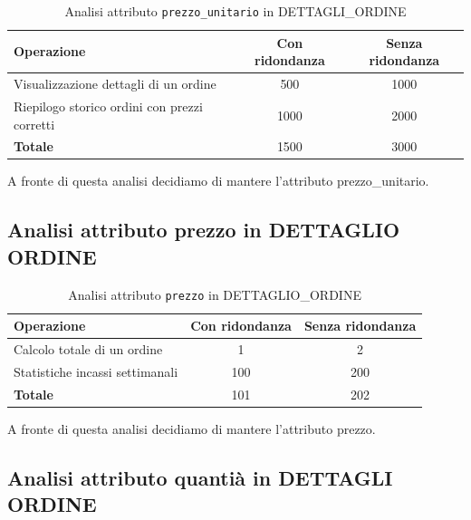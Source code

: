 \documentclass[a4paper,12pt]{report}
\begin{document}
\begin{table}[H]
	\centering
	\begin{tabular}{|l|c|c|}
		\hline
		\textbf{Operazione}                          & \textbf{Con ridondanza} & \textbf{Senza ridondanza} \\
		\hline
		Visualizzazione dettagli di un ordine        & 500                     & 1000                      \\
		Riepilogo storico ordini con prezzi corretti & 1000                    & 2000                      \\
		\hline
		\textbf{Totale}                              & 1500                    & 3000                      \\
		\hline
	\end{tabular}
	\caption{Analisi attributo \texttt{prezzo\_unitario} in DETTAGLI\_ORDINE}
\end{table}

A fronte di questa analisi decidiamo di mantere l'attributo prezzo\_unitario.

\subsection{Analisi attributo prezzo in DETTAGLIO ORDINE}

\begin{table}[H]
	\centering
	\begin{tabular}{|l|c|c|}
		\hline
		\textbf{Operazione}             & \textbf{Con ridondanza} & \textbf{Senza ridondanza} \\
		\hline
		Calcolo totale di un ordine     & 1                       & 2                         \\
		Statistiche incassi settimanali & 100                     & 200                       \\
		\hline
		\textbf{Totale}                 & 101                     & 202                       \\
		\hline
	\end{tabular}
	\caption{Analisi attributo \texttt{prezzo} in DETTAGLIO\_ORDINE}
\end{table}

A fronte di questa analisi decidiamo di mantere l'attributo prezzo.

\subsection{Analisi attributo quantià in DETTAGLI ORDINE}
\end{document}
